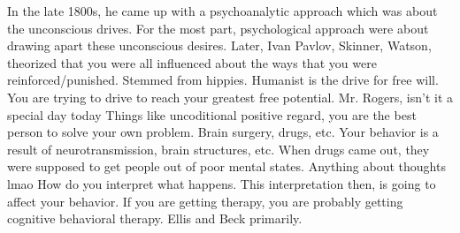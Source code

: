 \markdownRendererUlItem In the late 1800s, he came up with a psychoanalytic approach which was about the unconscious drives.\markdownRendererUlItemEnd 
\markdownRendererUlItem For the most part, psychological approach were about drawing apart these unconscious desires.\markdownRendererUlItemEnd 
\markdownRendererUlEndTight \markdownRendererInterblockSeparator
{}\markdownRendererInterblockSeparator
{}\markdownRendererUlBeginTight
\markdownRendererUlItem Later, Ivan Pavlov, Skinner, Watson, theorized that you were all influenced about the ways that you were reinforced/punished.\markdownRendererUlItemEnd 
\markdownRendererUlEndTight \markdownRendererInterblockSeparator
{}\markdownRendererInterblockSeparator
{}\markdownRendererUlBeginTight
\markdownRendererUlItem Stemmed from hippies.\markdownRendererUlItemEnd 
\markdownRendererUlItem Humanist is the drive for free will.\markdownRendererUlItemEnd 
\markdownRendererUlItem You are trying to drive to reach your greatest free potential.\markdownRendererUlItemEnd 
\markdownRendererUlEndTight \markdownRendererInterblockSeparator
{}\markdownRendererBlockQuoteBegin
Mr. Rogers, isn't it a special day today
\markdownRendererBlockQuoteEnd \markdownRendererInterblockSeparator
{}\markdownRendererUlBeginTight
\markdownRendererUlItem Things like uncoditional positive regard, you are the best person to solve your own problem.\markdownRendererUlItemEnd 
\markdownRendererUlEndTight \markdownRendererInterblockSeparator
{}\markdownRendererInterblockSeparator
{}\markdownRendererUlBeginTight
\markdownRendererUlItem Brain surgery, drugs, etc.\markdownRendererUlItemEnd 
\markdownRendererUlItem Your behavior is a result of neurotransmission, brain structures, etc.\markdownRendererUlItemEnd 
\markdownRendererUlItem When drugs came out, they were supposed to get people out of poor mental states.\markdownRendererUlItemEnd 
\markdownRendererUlEndTight \markdownRendererInterblockSeparator
{}\markdownRendererInterblockSeparator
{}\markdownRendererUlBeginTight
\markdownRendererUlItem Anything about thoughts lmao\markdownRendererUlItemEnd 
\markdownRendererUlItem How do you interpret what happens.\markdownRendererUlItemEnd 
\markdownRendererUlItem This interpretation then, is going to affect your behavior. If you are getting therapy, you are probably getting cognitive behavioral therapy.\markdownRendererUlItemEnd 
\markdownRendererUlItem Ellis and Beck primarily.\markdownRendererUlItemEnd 
